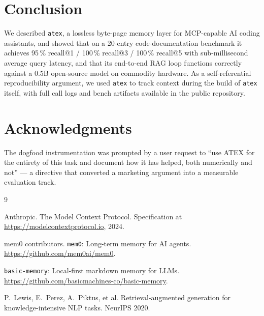 \documentclass[10pt,letterpaper]{article}
\begin{document}
\section{Conclusion}
We described \texttt{atex}, a lossless byte-page memory layer for MCP-capable AI coding assistants, and showed that on a 20-entry code-documentation benchmark it achieves 95\,\% recall@1 / 100\,\% recall@3 / 100\,\% recall@5 with sub-millisecond average query latency, and that its end-to-end RAG loop functions correctly against a 0.5B open-source model on commodity hardware. As a self-referential reproducibility argument, we used \texttt{atex} to track context during the build of \texttt{atex} itself, with full call logs and bench artifacts available in the public repository.

\section*{Acknowledgments}
The dogfood instrumentation was prompted by a user request to ``use ATEX for the entirety of this task and document how it has helped, both numerically and not'' --- a directive that converted a marketing argument into a measurable evaluation track.

\begin{thebibliography}{9}

Anthropic. The Model Context Protocol. Specification at \url{https://modelcontextprotocol.io}, 2024.

mem0 contributors. \texttt{mem0}: Long-term memory for AI agents. \url{https://github.com/mem0ai/mem0}.

\texttt{basic-memory}: Local-first markdown memory for LLMs. \url{https://github.com/basicmachines-co/basic-memory}.

P.~Lewis, E.~Perez, A.~Piktus, et al. Retrieval-augmented generation for knowledge-intensive NLP tasks. NeurIPS 2020.

\end{thebibliography}
\end{document}
